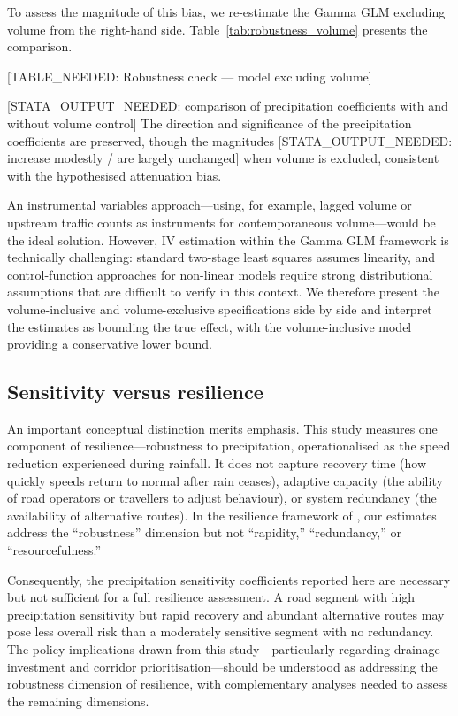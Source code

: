 \documentclass[review]{elsarticle}
\begin{document}
To assess the magnitude of this bias, we re-estimate the Gamma GLM excluding volume from the right-hand side. Table~\ref{tab:robustness_volume} presents the comparison.

\begin{table}[htbp]
\centering
\caption{Robustness check: Gamma GLM with and without traffic volume}
\label{tab:robustness_volume}
[TABLE\_NEEDED: Robustness check --- model excluding volume]
\end{table}

[STATA\_OUTPUT\_NEEDED: comparison of precipitation coefficients with and without volume control] The direction and significance of the precipitation coefficients are preserved, though the magnitudes [STATA\_OUTPUT\_NEEDED: increase modestly / are largely unchanged] when volume is excluded, consistent with the hypothesised attenuation bias.

An instrumental variables approach---using, for example, lagged volume or upstream traffic counts as instruments for contemporaneous volume---would be the ideal solution. However, IV estimation within the Gamma GLM framework is technically challenging: standard two-stage least squares assumes linearity, and control-function approaches for non-linear models \citep{wooldridge2015control} require strong distributional assumptions that are difficult to verify in this context. We therefore present the volume-inclusive and volume-exclusive specifications side by side and interpret the estimates as bounding the true effect, with the volume-inclusive model providing a conservative lower bound.

\subsection{Sensitivity versus resilience}
\label{sec:disc:sensitivity}

An important conceptual distinction merits emphasis. This study measures one component of resilience---robustness to precipitation, operationalised as the speed reduction experienced during rainfall. It does not capture recovery time (how quickly speeds return to normal after rain ceases), adaptive capacity (the ability of road operators or travellers to adjust behaviour), or system redundancy (the availability of alternative routes). In the resilience framework of \citet{calvert2018methodology}, our estimates address the ``robustness'' dimension but not ``rapidity,'' ``redundancy,'' or ``resourcefulness.''

Consequently, the precipitation sensitivity coefficients reported here are necessary but not sufficient for a full resilience assessment. A road segment with high precipitation sensitivity but rapid recovery and abundant alternative routes may pose less overall risk than a moderately sensitive segment with no redundancy. The policy implications drawn from this study---particularly regarding drainage investment and corridor prioritisation---should be understood as addressing the robustness dimension of resilience, with complementary analyses needed to assess the remaining dimensions.
\end{document}
